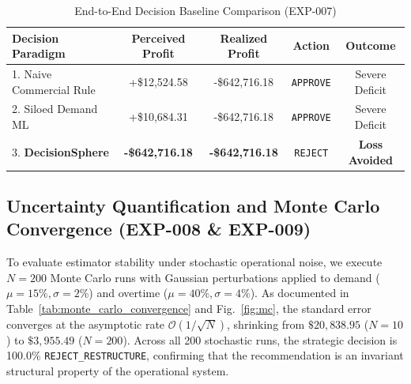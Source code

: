 \documentclass[conference]{IEEEtran}
\begin{document}
\begin{table}[htbp]
\caption{End-to-End Decision Baseline Comparison (EXP-007)}
\begin{center}
\begin{tabular}{lcccc}
\toprule
\textbf{Decision Paradigm} & \textbf{Perceived Profit} & \textbf{Realized Profit} & \textbf{Action} & \textbf{Outcome} \\
\midrule
1. Naive Commercial Rule & +\$12,524.58 & -\$642,716.18 & \texttt{APPROVE} & Severe Deficit \\
2. Siloed Demand ML & +\$10,684.31 & -\$642,716.18 & \texttt{APPROVE} & Severe Deficit \\
3. \textbf{DecisionSphere} & \textbf{-\$642,716.18} & \textbf{-\$642,716.18} & \texttt{REJECT} & \textbf{Loss Avoided} \\
\bottomrule
\end{tabular}
\label{tab:baseline_comparison}
\end{center}
\end{table}

\subsection{Uncertainty Quantification and Monte Carlo Convergence (EXP-008 \& EXP-009)}
To evaluate estimator stability under stochastic operational noise, we execute $N=200$ Monte Carlo runs with Gaussian perturbations applied to demand ($\mu=15\%, \sigma=2\%$) and overtime ($\mu=40\%, \sigma=4\%$). As documented in Table~\ref{tab:monte_carlo_convergence} and Fig.~\ref{fig:mc}, the standard error converges at the asymptotic rate $\mathcal{O}(1/\sqrt{N})$, shrinking from $\$20,838.95$ ($N=10$) to $\$3,955.49$ ($N=200$). Across all 200 stochastic runs, the strategic decision is 100.0\% \texttt{REJECT\_RESTRUCTURE}, confirming that the recommendation is an invariant structural property of the operational system.
\end{document}
